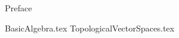 \documentclass[
    oneside
]{styles/mori-book}%
\begin{document}
    \makecoverpage
    \maketitlepage

    \frontmatter
    \pagestyle{front}
    {Preface}

    \maketocpage

    \mainmatter
    \pagestyle{main}

    {BasicAlgebra.tex}
    {TopologicalVectorSpaces.tex}
    
    \printindex
    \printnomenclature
    
\end{document}
